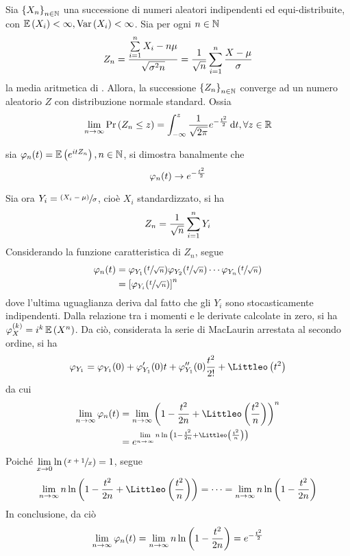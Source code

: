\documentclass{subfiles}
\begin{document}
\begin{Theorem*}
    Sia $\Sequence{X_{n}}$ una successione di numeri aleatori indipendenti ed equi-distribuite, con $\Expected{X_{i}} < \infty, \Var{X_{i}} < \infty$.
    Sia per ogni $n \in \operatorname{\mathbb{N}}$
    $$
        Z_{n} = \Frac{\Sum{X_{i} - n\mu}{i = 1}[n]}{\sqrt{\sigma^{2} n}} = \Frac{1}{\sqrt{n}} \Sum{\Frac{X - \mu}{\sigma}}{i = 1}[n]
    $$
    la media aritmetica di .
    Allora, la successione $\Sequence{Z_{n}}$ converge ad un numero aleatorio $Z$ con distribuzione normale standard.
    Ossia
    $$
        \Lim{n}{\infty}{\Prob{Z_{n} \le z}} = \Int{\Frac{1}{\sqrt{2\pi}} e^{-\Frac{t^{2}}{2}}}{t}[-\infty][z], \forall z \in \Real
    $$
    \begin{Proof*}
        sia $\varphi_{n}(t) = \Expected{e^{itZ_{n}}}, n \in \Natural$, si dimostra banalmente che
        $$
            \varphi_{n}(t) \to e^{-\Frac{t^{2}}{2}}
        $$

        Sia ora $Y_{i} = \Frac*{(X_{i} - \mu)}{\sigma}$, cioè $X_{i}$ standardizzato, si ha
        $$
            Z_{n} = \Frac{1}{\sqrt{n}} \Sum{Y_{i}}{i = 1}[n]
        $$
        Considerando la funzione caratteristica di $Z_{n}$, segue
        $$\begin{aligned}
                \varphi_{n}(t) & = \varphi_{Y_{1}}(\Frac*{t}{\sqrt{n}}) \varphi_{Y_{2}}(\Frac*{t}{\sqrt{n}}) \cdots \varphi_{Y_{n}}(\Frac*{t}{\sqrt{n}}) \\
                               & = \left[ \varphi_{Y_{i}}(\Frac*{t}{\sqrt{n}}) \right]^{n}
            \end{aligned}$$
        dove l'ultima uguaglianza deriva dal fatto che gli $Y_{i}$ sono stocasticamente indipendenti.
        Dalla relazione tra i momenti e le derivate calcolate in zero, si ha $\varphi_{X}^{(k)} = i^{k} \Expected{X^{n}}$.
        Da ciò, considerata la serie di MacLaurin arrestata al secondo ordine, si ha
        $$
            \varphi_{Y_{1}} = \varphi_{Y_{1}}(0) + \varphi_{Y_{1}}'(0)t + \varphi_{Y_{1}}''(0) \Frac{t^{2}}{2!} + \LittleO{t^{2}}
        $$
        da cui
        $$\begin{aligned}
                \Lim{n}{\infty}{\varphi_{n}(t)} & = \Lim{n}{\infty}{\left(1 - \Frac{t^{2}}{2n} + \LittleO{\Frac{t^{2}}{n}}\right)^{n}} \\
                                                & = e^{\Lim{n}{\infty}{n \Log*{1 - \Frac{t^{2}}{2n} + \LittleO{\Frac{t^{2}}{n}}}}}
            \end{aligned}$$
        Poiché $\Lim{x}{0}{\Log*{\Frac*{x + 1}{x}}} = 1$, segue
        $$
            \Lim{n}{\infty}{n \Log*{1 - \Frac{t^{2}}{2n} + \LittleO{\Frac{t^{2}}{n}}}} = \cdots = \Lim{n}{\infty}{n \Log*{1 - \Frac{t^{2}}{2n}}}
        $$
        In conclusione, da ciò
        $$
            \Lim{n}{\infty}{\varphi_{n}(t)} = \Lim{n}{\infty}{n \Log*{1 - \Frac{t^{2}}{2n}}} = e^{-\Frac{t^{2}}{2}}
        $$
    \end{Proof*}
\end{Theorem*}
\end{document}

